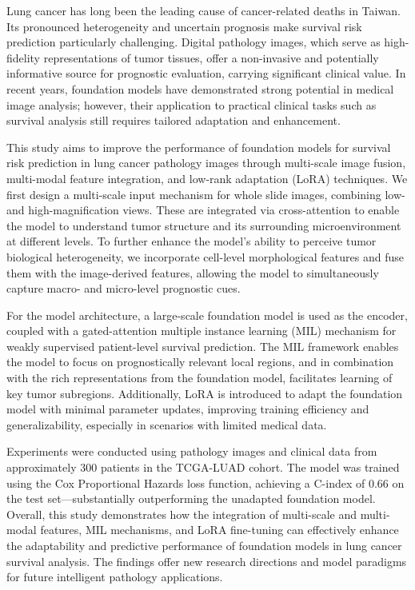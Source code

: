 
\begin{enAbstract}

    Lung cancer has long been the leading cause of cancer-related deaths in Taiwan. Its pronounced heterogeneity and uncertain prognosis make survival risk prediction particularly challenging. Digital pathology images, which serve as high-fidelity representations of tumor tissues, offer a non-invasive and potentially informative source for prognostic evaluation, carrying significant clinical value. In recent years, foundation models have demonstrated strong potential in medical image analysis; however, their application to practical clinical tasks such as survival analysis still requires tailored adaptation and enhancement.

    This study aims to improve the performance of foundation models for survival risk prediction in lung cancer pathology images through multi-scale image fusion, multi-modal feature integration, and low-rank adaptation (LoRA) techniques. We first design a multi-scale input mechanism for whole slide images, combining low- and high-magnification views. These are integrated via cross-attention to enable the model to understand tumor structure and its surrounding microenvironment at different levels. To further enhance the model’s ability to perceive tumor biological heterogeneity, we incorporate cell-level morphological features and fuse them with the image-derived features, allowing the model to simultaneously capture macro- and micro-level prognostic cues.
    
    For the model architecture, a large-scale foundation model is used as the encoder, coupled with a gated-attention multiple instance learning (MIL) mechanism for weakly supervised patient-level survival prediction. The MIL framework enables the model to focus on prognostically relevant local regions, and in combination with the rich representations from the foundation model, facilitates learning of key tumor subregions. Additionally, LoRA is introduced to adapt the foundation model with minimal parameter updates, improving training efficiency and generalizability, especially in scenarios with limited medical data.
    
    Experiments were conducted using pathology images and clinical data from approximately 300 patients in the TCGA-LUAD cohort. The model was trained using the Cox Proportional Hazards loss function, achieving a C-index of 0.66 on the test set—substantially outperforming the unadapted foundation model. Overall, this study demonstrates how the integration of multi-scale and multi-modal features, MIL mechanisms, and LoRA fine-tuning can effectively enhance the adaptability and predictive performance of foundation models in lung cancer survival analysis. The findings offer new research directions and model paradigms for future intelligent pathology applications.
    
    \enAbsKeywords
\end{enAbstract}
